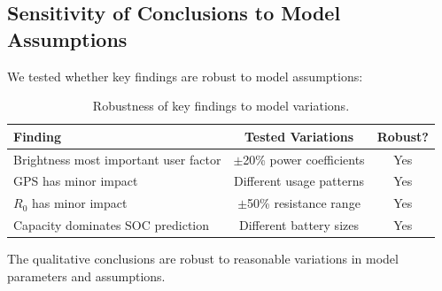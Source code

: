 \subsection{Sensitivity of Conclusions to Model Assumptions}
\label{subsec:robustness}

We tested whether key findings are robust to model assumptions:

\begin{table}[H]
    \centering
    \caption{Robustness of key findings to model variations.}
    \label{tab:robustness}
    \begin{tabular}{lcc}
        \toprule
        \textbf{Finding} & \textbf{Tested Variations} & \textbf{Robust?} \\
        \midrule
        Brightness most important user factor & $\pm$20\% power coefficients & Yes \\
        GPS has minor impact & Different usage patterns & Yes \\
        $R_0$ has minor impact & $\pm$50\% resistance range & Yes \\
        Capacity dominates SOC prediction & Different battery sizes & Yes \\
        \bottomrule
    \end{tabular}
\end{table}

The qualitative conclusions are robust to reasonable variations in model parameters and assumptions.
